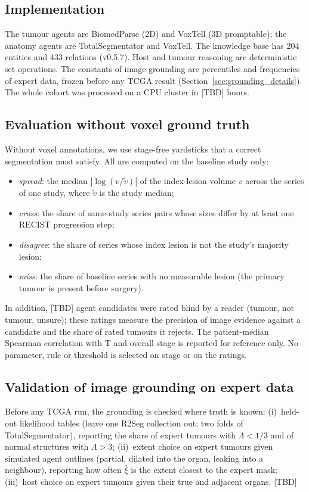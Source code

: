 \documentclass[fleqn,10pt]{olplainarticle}
\begin{document}
\subsection{Implementation}
The tumour agents are BiomedParse (2D) and VoxTell (3D promptable); the anatomy agents are TotalSegmentator and VoxTell. The
knowledge base has 204 entities and 433 relations (v0.5.7). Host and tumour reasoning are deterministic set operations.
The constants of image grounding are percentiles and frequencies of expert data, frozen before any TCGA result
(Section~\ref{sec:grounding_details}). The whole cohort was processed on a CPU cluster in [TBD] hours.

\subsection{Evaluation without voxel ground truth}
\label{sec:eval_protocol}
Without voxel annotations, we use stage-free yardsticks that a correct segmentation must satisfy. All are computed on
the baseline study only:
\begin{itemize}
  \item \emph{spread}: the median $|\log(v/\tilde v)|$ of the index-lesion volume $v$ across the series of one study,
  where $\tilde v$ is the study median;
  \item \emph{cross}: the share of same-study series pairs whose sizes differ by at least one RECIST progression step;
  \item \emph{disagree}: the share of series whose index lesion is not the study's majority lesion;
  \item \emph{miss}: the share of baseline series with no measurable lesion (the primary tumour is present before
  surgery).
\end{itemize}
In addition, [TBD] agent candidates were rated blind by a reader (tumour, not tumour, unsure); these ratings measure the
precision of image evidence against a candidate and the share of rated tumours it rejects. The patient-median Spearman
correlation with T and overall stage is reported for reference only. No parameter, rule or threshold is selected on stage
or on the ratings.

\subsection{Validation of image grounding on expert data}
\label{sec:results_expert}
Before any TCGA run, the grounding is checked where truth is known: (i)~held-out likelihood tables (leave one R2Seg
collection out; two folds of TotalSegmentator), reporting the share of expert tumours with $\Lambda<1/3$ and of normal
structures with $\Lambda>3$; (ii)~extent choice on expert tumours given simulated agent outlines (partial, dilated into the
organ, leaking into a neighbour), reporting how often $\hat\xi$ is the extent closest to the expert mask; (iii)~host choice on
expert tumours given their true and adjacent organs. [TBD]
\end{document}
